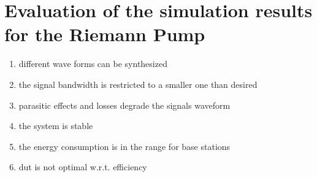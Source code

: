 
 


\section{Evaluation of the simulation results for the Riemann Pump}

\begin{enumerate}
	\item different wave forms can be synthesized
	\item the signal bandwidth is restricted to a smaller one than desired
	\item parasitic effects and losses degrade the signals waveform
	\item the system is stable
	\item the energy consumption is in the range for base stations
	\item dut is not optimal w.r.t. efficiency
\end{enumerate}







